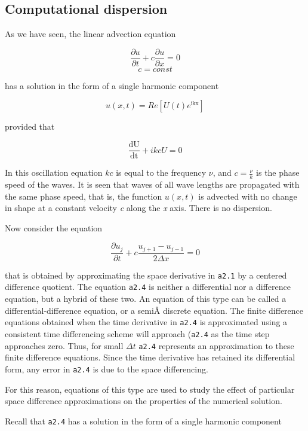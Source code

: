 \subsection{\texorpdfstring{\textbf{Computational
dispersion}}{Computational dispersion}}\label{Section3.2}

As we have seen, the linear advection equation

 {\[\frac{\partial u}{\partial t} + c\frac{\partial u}{\partial x} = 0\]\[c = const\]}

has a solution in the form of a single harmonic component

 {\[u\left( x,t \right) = Re\left\lbrack U\left( t \right)e^{\text{ikx}} \right\rbrack\]}

provided that

 {\[\frac{\text{dU}}{\text{dt}} + ikcU = 0\]}

In this oscillation equation \(kc\) is equal to the frequency \(\nu\),
and \(c = \frac{\nu}{k}\) is the phase speed of the waves. It is seen
that waves of all wave lengths are propagated with the same phase speed,
that is, the function \(u\left( x,t \right)\) is advected with no change
in shape at a constant velocity \emph{c} along the \emph{x} axis. There
is no dispersion.

Now consider the equation

 {\[\frac{{\partial u}_{j}}{\partial t} + c\frac{u_{j + 1} - u_{j - 1}}{2\Delta x} = 0\]}

that is obtained by approximating the space derivative in \texttt{a2.1}
by a centered difference quotient. The equation \texttt{a2.4} is neither
a differential nor a difference equation, but a hybrid of these two. An
equation of this type can be called a differential-difference equation,
or a semiÂ­ discrete equation. The finite difference equations obtained
when the time derivative in \texttt{a2.4} is approximated using a
consistent time differencing scheme will approach (\texttt{a2.4} as the
time step approaches zero. Thus, for small \(\Delta t\) \texttt{a2.4}
represents an approximation to these finite difference equations. Since
the time derivative has retained its differential form, any error in
\texttt{a2.4} is due to the space differencing.

For this reason, equations of this type are used to study the effect of
particular space difference approximations on the properties of the
numerical solution.

Recall that \texttt{a2.4} has a solution in the form of a single
harmonic component

